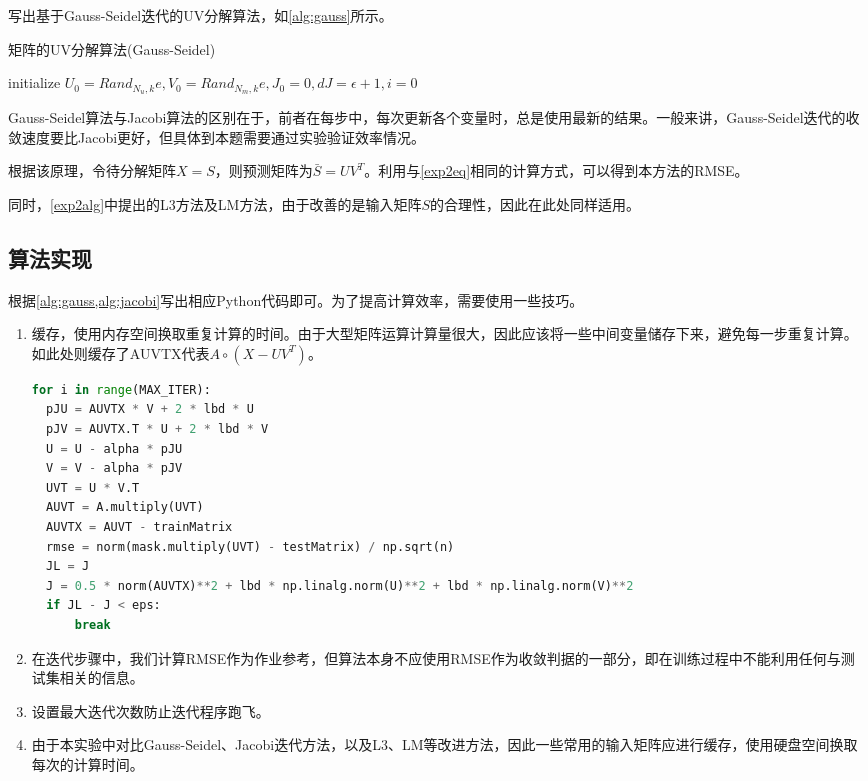 \documentclass[a4paper,12pt]{article}
\begin{document}
    写出基于Gauss-Seidel迭代的UV分解算法，如\cref{alg:gauss}所示。
    \begin{algorithm}
        \caption{矩阵的UV分解算法(Gauss-Seidel)}
        \label{alg:gauss}

        initialize $U_0=Rand_{N_u,k}e, V_0=Rand_{N_m,k}e, J_0=0, dJ = \epsilon + 1, i=0$\;
    \end{algorithm}

    Gauss-Seidel算法与Jacobi算法的区别在于，前者在每步中，每次更新各个变量时，总是使用最新的结果。一般来讲，Gauss-Seidel迭代的收敛速度要比Jacobi更好，但具体到本题需要通过实验验证效率情况。

    根据该原理，令待分解矩阵$X=S$，则预测矩阵为$\bar S=UV^T$。利用与\cref{exp2eq}相同的计算方式，可以得到本方法的RMSE。

    同时，\cref{exp2alg}中提出的L3方法及LM方法，由于改善的是输入矩阵$S$的合理性，因此在此处同样适用。
    \subsection{算法实现}
    根据\cref{alg:gauss,alg:jacobi}写出相应Python代码即可。为了提高计算效率，需要使用一些技巧。
    \begin{enumerate}
      \item 缓存，使用内存空间换取重复计算的时间。由于大型矩阵运算计算量很大，因此应该将一些中间变量储存下来，避免每一步重复计算。如此处则缓存了AUVTX代表$A\circ (X-UV^T)$。
    \begin{lstlisting}[language=python,breaklines=true]
for i in range(MAX_ITER):
  pJU = AUVTX * V + 2 * lbd * U
  pJV = AUVTX.T * U + 2 * lbd * V
  U = U - alpha * pJU
  V = V - alpha * pJV
  UVT = U * V.T
  AUVT = A.multiply(UVT)
  AUVTX = AUVT - trainMatrix
  rmse = norm(mask.multiply(UVT) - testMatrix) / np.sqrt(n)
  JL = J
  J = 0.5 * norm(AUVTX)**2 + lbd * np.linalg.norm(U)**2 + lbd * np.linalg.norm(V)**2
  if JL - J < eps:
      break
    \end{lstlisting}
      \item 在迭代步骤中，我们计算RMSE作为作业参考，但算法本身不应使用RMSE作为收敛判据的一部分，即在训练过程中不能利用任何与测试集相关的信息。
      \item 设置最大迭代次数防止迭代程序跑飞。
      \item 由于本实验中对比Gauss-Seidel、Jacobi迭代方法，以及L3、LM等改进方法，因此一些常用的输入矩阵应进行缓存，使用硬盘空间换取每次的计算时间。
    \end{enumerate}
\end{document}
